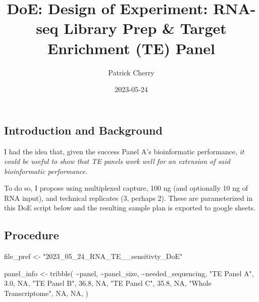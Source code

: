 \documentclass[
]{article}
\title{DoE: Design of Experiment: RNA-seq Library Prep \& Target
Enrichment (TE) Panel}
\author{Patrick Cherry}
\date{2023-05-24}
\newenvironment{Shaded}{\begin{snugshade}}{\end{snugshade}}
\newcommand{\ConstantTok}[1]{\textcolor[rgb]{0.00,0.00,0.00}{#1}}
\newcommand{\FloatTok}[1]{\textcolor[rgb]{0.00,0.00,0.81}{#1}}
\newcommand{\FunctionTok}[1]{\textcolor[rgb]{0.00,0.00,0.00}{#1}}
\newcommand{\NormalTok}[1]{#1}
\newcommand{\OtherTok}[1]{\textcolor[rgb]{0.56,0.35,0.01}{#1}}
\newcommand{\SpecialCharTok}[1]{\textcolor[rgb]{0.00,0.00,0.00}{#1}}
\newcommand{\StringTok}[1]{\textcolor[rgb]{0.31,0.60,0.02}{#1}}
\begin{document}
\maketitle

{
\setcounter{tocdepth}{2}
\tableofcontents
}
\hypertarget{introduction-and-background}{%
\subsection{Introduction and
Background}\label{introduction-and-background}}

I had the idea that, given the success Panel A's bioinformatic
performance, \emph{it could be useful to show that TE panels work well
for an extension of said bioinformatic performance.}

To do so, I propose using multiplexed capture, 100 ng (and optionally 10
ng of RNA input), and technical replicates (3, perhaps 2). These are
parameterized in this DoE script below and the resulting sample plan is
exported to google sheets.

\hypertarget{procedure}{%
\subsection{Procedure}\label{procedure}}

\begin{Shaded}
\begin{Highlighting}[]
\NormalTok{file\_pref }\OtherTok{\textless{}{-}} \StringTok{"2023\_05\_24\_RNA\_TE\_\_sensitivty\_DoE"}
\end{Highlighting}
\end{Shaded}

\begin{Shaded}
\begin{Highlighting}[]
\NormalTok{panel\_info }\OtherTok{\textless{}{-}} \FunctionTok{tribble}\NormalTok{(}
  \SpecialCharTok{\textasciitilde{}}\NormalTok{panel,  }\SpecialCharTok{\textasciitilde{}}\NormalTok{panel\_size,  }\SpecialCharTok{\textasciitilde{}}\NormalTok{needed\_sequencing,}
  \StringTok{"TE Panel A"}\NormalTok{, }\FloatTok{3.0}\NormalTok{, }\ConstantTok{NA}\NormalTok{,}
  \StringTok{"TE Panel B"}\NormalTok{,  }\FloatTok{36.8}\NormalTok{, }\ConstantTok{NA}\NormalTok{,}
  \StringTok{"TE Panel C"}\NormalTok{,  }\FloatTok{35.8}\NormalTok{, }\ConstantTok{NA}\NormalTok{,}
  \StringTok{"Whole Transcriptome"}\NormalTok{, }\ConstantTok{NA}\NormalTok{, }\ConstantTok{NA}\NormalTok{,}
\NormalTok{)}
\end{Highlighting}
\end{Shaded}
\end{document}
